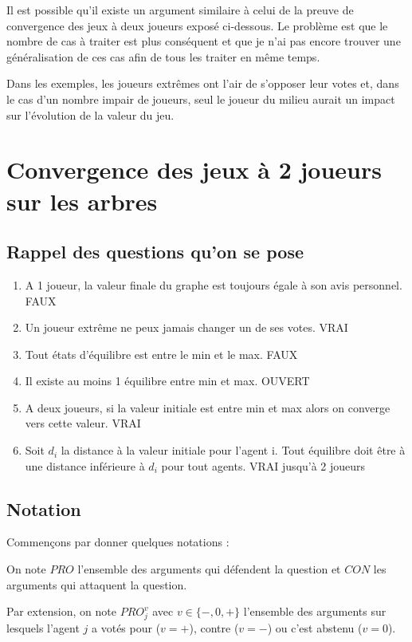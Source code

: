 \documentclass[12pt]{article}
\theoremstyle{defi}
\theoremstyle{not}
\theoremstyle{prob}
\begin{document}
      Il est possible qu'il existe un argument similaire à celui de la preuve de convergence des jeux à deux joueurs exposé ci-dessous.
      Le problème est que le nombre de cas à traiter est plus conséquent et que je n'ai pas encore trouver une généralisation de ces cas afin de tous les traiter en même temps.

      Dans les exemples, les joueurs extrêmes ont l'air de s'opposer leur votes et, dans le cas d'un nombre impair de joueurs, seul le joueur du milieu aurait un impact sur l'évolution de la valeur du jeu.
\color{blue}
  \section{Convergence des jeux à 2 joueurs sur les arbres}
    \subsection{Rappel des questions qu'on se pose}
      \begin{enumerate}
        \item A 1 joueur, la valeur finale du graphe est toujours égale à son avis personnel. FAUX
        \item Un joueur extrême ne peux jamais changer un de ses votes. VRAI
        \item Tout états d'équilibre est entre le min et le max. FAUX
        \item Il existe au moins 1 équilibre entre min et max. OUVERT
        \item A deux joueurs, si la valeur initiale est entre min et max alors on converge vers cette valeur. VRAI
        \item Soit $d_i$ la distance à la valeur initiale pour l'agent i. Tout équilibre doit être à une distance inférieure à $d_i$ pour tout agents. VRAI jusqu'à 2 joueurs
      \end{enumerate}

    \subsection{Notation}
      Commençons par donner quelques notations :

      On note $PRO$ l'ensemble des arguments qui défendent la question et $CON$ les arguments qui attaquent la question.

      Par extension, on note $PRO^v_j$ avec $v \in \{-, 0, +\}$ l'ensemble des arguments sur lesquels l'agent $j$ a votés pour ($v = +$), contre ($v = -$) ou c'est abstenu ($v = 0$).
\end{document}
